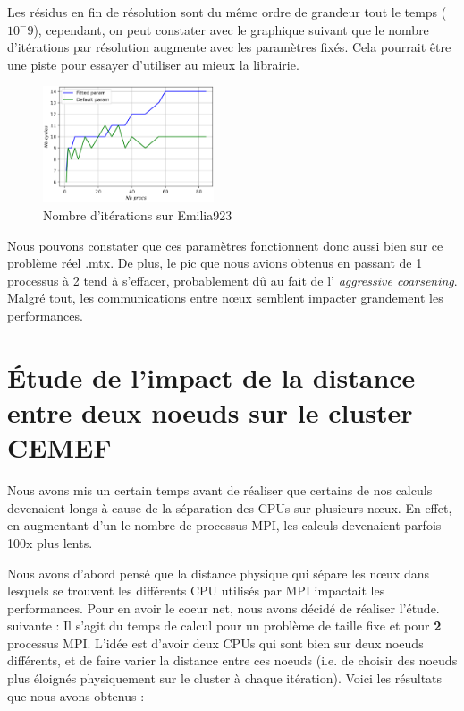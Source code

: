 \documentclass[10pt,twocolumn,letterpaper]{article}
\begin{document}
Les résidus en fin de résolution sont du même ordre de grandeur tout le temps
($10^-9$), cependant, on peut constater avec le graphique suivant que le nombre
d'itérations par résolution augmente avec les paramètres fixés. Cela pourrait
être une piste pour essayer d'utiliser au mieux la librairie.

\begin{figure}[H]
  \centering
  \caption{Nombre d'itérations sur Emilia923}
\includegraphics[width=0.45\textwidth]{fig/strong_best_param_emilia_nbiter.png}
\end{figure}

Nous pouvons constater que ces paramètres fonctionnent donc aussi bien sur ce
problème réel .mtx.
De plus, le pic que nous avions obtenus en passant de 1 processus
à 2 tend à s'effacer, probablement dû au fait de l'
\textit{aggressive coarsening}. Malgré tout, les communications entre nœux
semblent impacter grandement les performances.

\section{Étude de l'impact de la distance entre deux noeuds sur le cluster
CEMEF}

Nous avons mis un certain temps avant de réaliser que certains de nos calculs
devenaient longs à cause de la séparation des CPUs sur plusieurs nœux. En effet,
en augmentant d'un le nombre de processus MPI, les calculs devenaient parfois
100x plus lents.

Nous avons d'abord pensé que la distance physique qui sépare les nœux dans
lesquels se trouvent les différents CPU utilisés par MPI impactait les
performances. Pour en avoir le coeur net, nous avons décidé de réaliser l'étude.
suivante :
Il s'agit du temps de calcul pour un problème de taille fixe et pour \textbf{2}
processus MPI. L'idée est d'avoir deux CPUs qui sont bien sur deux noeuds
différents, et de faire varier la distance entre ces noeuds
(i.e. de choisir des noeuds plus éloignés physiquement sur le cluster à chaque
itération). Voici les résultats que nous avons obtenus :
\end{document}
